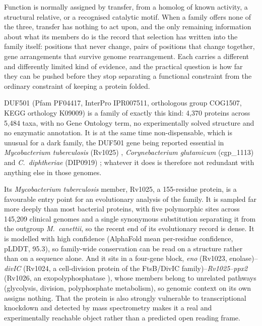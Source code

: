 \documentclass[11pt,a4paper]{article}
\newcommand{\mtb}{\textit{Mycobacterium tuberculosis}}
\begin{document}
Function is normally assigned by transfer, from a homolog of known activity, a structural relative, or a recognised catalytic motif. When a family offers none of the three, transfer has nothing to act upon, and the only remaining information about what its members do is the record that selection has written into the family itself: positions that never change, pairs of positions that change together, gene arrangements that survive genome rearrangement. Each carries a different and differently limited kind of evidence, and the practical question is how far they can be pushed before they stop separating a functional constraint from the ordinary constraint of keeping a protein folded.

DUF501 (Pfam PF04417, InterPro IPR007511, orthologous group COG1507, KEGG orthology K09009) is a family of exactly this kind: 4{,}370 proteins across 5{,}484 taxa, with no Gene Ontology term, no experimentally solved structure and no enzymatic annotation. It is at the same time non-dispensable, which is unusual for a dark family, the DUF501 gene being reported essential in \mtb{} (Rv1025) \citep{dejesus2017essentiality}, \textit{Corynebacterium glutamicum} (cgp\_1113) and \textit{C.\ diphtheriae} (DIP0919) \citep{goodall2023diphtheriae}; whatever it does is therefore not redundant with anything else in those genomes.

Its \mtb{} member, Rv1025, a 155-residue protein, is a favourable entry point for an evolutionary analysis of the family. It is sampled far more deeply than most bacterial proteins, with five polymorphic sites across 145{,}209 clinical genomes and a single synonymous substitution separating it from the outgroup \textit{M.\ canettii}, so the recent end of its evolutionary record is dense. It is modelled with high confidence (AlphaFold mean per-residue confidence, pLDDT, 95.3), so family-wide conservation can be read on a structure rather than on a sequence alone. And it sits in a four-gene block, \textit{eno} (Rv1023, enolase)--\textit{divIC} (Rv1024, a cell-division protein of the FtsB/DivIC family)--\textit{Rv1025}--\textit{ppx2} (Rv1026, an exopolyphosphatase \citep{chuang2015rv1026ppx2,choi2012ppxgppa,tiwari2019polyp}), whose members belong to unrelated pathways (glycolysis, division, polyphosphate metabolism), so genomic context on its own assigns nothing. That the protein is also strongly vulnerable to transcriptional knockdown \citep{bosch2021vulnerability} and detected by mass spectrometry makes it a real and experimentally reachable object rather than a predicted open reading frame.
\end{document}
